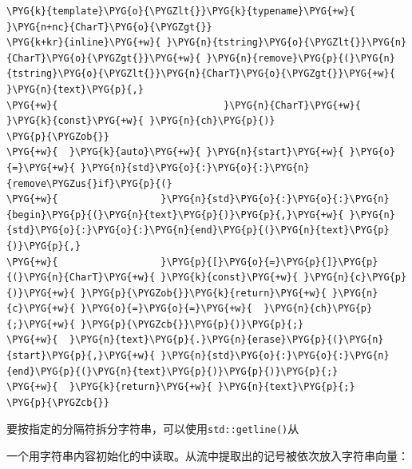 \begin{codeblockbg}
\begin{Verbatim}[commandchars=\\\{\},breaklines=true,breakanywhere=true,fontsize=\codefont,xleftmargin=17bp]
\PYG{k}{template}\PYG{o}{\PYGZlt{}}\PYG{k}{typename}\PYG{+w}{ }\PYG{n+nc}{CharT}\PYG{o}{\PYGZgt{}}
\PYG{k+kr}{inline}\PYG{+w}{ }\PYG{n}{tstring}\PYG{o}{\PYGZlt{}}\PYG{n}{CharT}\PYG{o}{\PYGZgt{}}\PYG{+w}{ }\PYG{n}{remove}\PYG{p}{(}\PYG{n}{tstring}\PYG{o}{\PYGZlt{}}\PYG{n}{CharT}\PYG{o}{\PYGZgt{}}\PYG{+w}{ }\PYG{n}{text}\PYG{p}{,}
\PYG{+w}{                             }\PYG{n}{CharT}\PYG{+w}{ }\PYG{k}{const}\PYG{+w}{ }\PYG{n}{ch}\PYG{p}{)}
\PYG{p}{\PYGZob{}}
\PYG{+w}{  }\PYG{k}{auto}\PYG{+w}{ }\PYG{n}{start}\PYG{+w}{ }\PYG{o}{=}\PYG{+w}{ }\PYG{n}{std}\PYG{o}{:}\PYG{o}{:}\PYG{n}{remove\PYGZus{}if}\PYG{p}{(}
\PYG{+w}{                  }\PYG{n}{std}\PYG{o}{:}\PYG{o}{:}\PYG{n}{begin}\PYG{p}{(}\PYG{n}{text}\PYG{p}{)}\PYG{p}{,}\PYG{+w}{ }\PYG{n}{std}\PYG{o}{:}\PYG{o}{:}\PYG{n}{end}\PYG{p}{(}\PYG{n}{text}\PYG{p}{)}\PYG{p}{,}
\PYG{+w}{                  }\PYG{p}{[}\PYG{o}{=}\PYG{p}{]}\PYG{p}{(}\PYG{n}{CharT}\PYG{+w}{ }\PYG{k}{const}\PYG{+w}{ }\PYG{n}{c}\PYG{p}{)}\PYG{+w}{ }\PYG{p}{\PYGZob{}}\PYG{k}{return}\PYG{+w}{ }\PYG{n}{c}\PYG{+w}{ }\PYG{o}{=}\PYG{o}{=}\PYG{+w}{  }\PYG{n}{ch}\PYG{p}{;}\PYG{+w}{ }\PYG{p}{\PYGZcb{}}\PYG{p}{)}\PYG{p}{;}
\PYG{+w}{  }\PYG{n}{text}\PYG{p}{.}\PYG{n}{erase}\PYG{p}{(}\PYG{n}{start}\PYG{p}{,}\PYG{+w}{ }\PYG{n}{std}\PYG{o}{:}\PYG{o}{:}\PYG{n}{end}\PYG{p}{(}\PYG{n}{text}\PYG{p}{)}\PYG{p}{)}\PYG{p}{;}
\PYG{+w}{  }\PYG{k}{return}\PYG{+w}{ }\PYG{n}{text}\PYG{p}{;}
\PYG{p}{\PYGZcb{}}
\end{Verbatim}
\end{codeblockbg}



要按指定的分隔符拆分字符串，可以使用\texttt{std::\allowbreak{}getline()}从



一个用字符串内容初始化的中读取。从流中提取出的记号被依次放入字符串向量：



